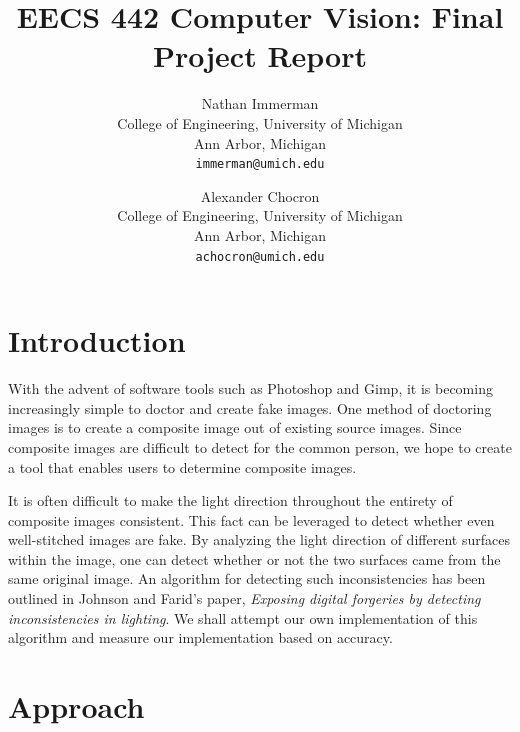 \documentclass[10pt,twocolumn,letterpaper]{article}
\begin{document}
\title{EECS 442 Computer Vision: Final Project Report}

\author{Nathan Immerman\\
College of Engineering, University of Michigan\\
Ann Arbor, Michigan\\
{\tt\small immerman@umich.edu}
\and
Alexander Chocron\\
College of Engineering, University of Michigan\\
Ann Arbor, Michigan\\
{\tt\small achocron@umich.edu}
}

\maketitle

\section{Introduction}

With the advent of software tools such as Photoshop and Gimp, it is becoming increasingly simple to doctor and create fake images. One method of doctoring images is to create a composite image out of existing source images. Since composite images are difficult to detect for the common person, we hope to create a tool that enables users to determine composite images.

It is often difficult to make the light direction throughout the entirety of composite images consistent. This fact can be leveraged to detect whether even well-stitched images are fake. By analyzing the light direction of different surfaces within the image, one can detect whether or not the two surfaces came from the same original image. An algorithm for detecting such inconsistencies has been outlined in Johnson and Farid's paper, \emph{Exposing digital forgeries by detecting inconsistencies in lighting}. We shall attempt our own implementation of this algorithm and measure our implementation based on accuracy.
\section{Approach}
\end{document}
